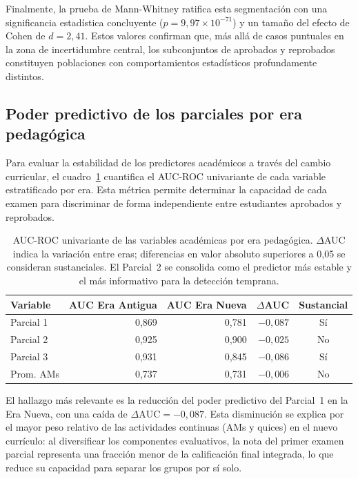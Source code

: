 \documentclass[12pt, letterpaper, openany]{report}
\begin{document}
Finalmente, la prueba de Mann-Whitney ratifica esta segmentación con una significancia estadística concluyente ($p = 9{,}97 \times 10^{-71}$) y un tamaño del efecto de Cohen de $d = 2{,}41$. Estos valores confirman que, más allá de casos puntuales en la zona de incertidumbre central, los subconjuntos de aprobados y reprobados constituyen poblaciones con comportamientos estadísticos profundamente distintos.

\FloatBarrier

\subsection{Poder predictivo de los parciales por era pedagógica}
\label{sssec:parciales_era}

Para evaluar la estabilidad de los predictores académicos a través del cambio curricular, el cuadro~\ref{tab:auc_era} cuantifica el AUC-ROC univariante de cada variable estratificado por era. Esta métrica permite determinar la capacidad de cada examen para discriminar de forma independiente entre estudiantes aprobados y reprobados.

\begin{table}[!ht]
  \centering
  \caption{AUC-ROC univariante de las variables académicas por era pedagógica. $\Delta$AUC indica la variación entre eras; diferencias en valor absoluto superiores a 0,05 se consideran sustanciales. El Parcial~2 se consolida como el predictor más estable y el más informativo para la detección temprana.}
  \label{tab:auc_era}
  \small
  \setlength{\tabcolsep}{5pt}
  \begin{tabularx}{\textwidth}{Xrrrc}
    \toprule
    Variable & AUC Era Antigua & AUC Era Nueva & $\Delta$AUC & Sustancial \\
    \midrule
    Parcial 1  & 0,869 & 0,781 & $-0{,}087$ & Sí \\ \addlinespace
    Parcial 2  & 0,925 & 0,900 & $-0{,}025$ & No \\ \addlinespace
    Parcial 3  & 0,931 & 0,845 & $-0{,}086$ & Sí \\ \addlinespace
    Prom. AMs  & 0,737 & 0,731 & $-0{,}006$ & No \\
    \bottomrule
  \end{tabularx}
\end{table}

El hallazgo más relevante es la reducción del poder predictivo del Parcial~1 en la Era Nueva, con una caída de $\Delta\text{AUC} = -0{,}087$. Esta disminución se explica por el mayor peso relativo de las actividades continuas (AMs y quices) en el nuevo currículo: al diversificar los componentes evaluativos, la nota del primer examen parcial representa una fracción menor de la calificación final integrada, lo que reduce su capacidad para separar los grupos por sí solo. 
\end{document}
